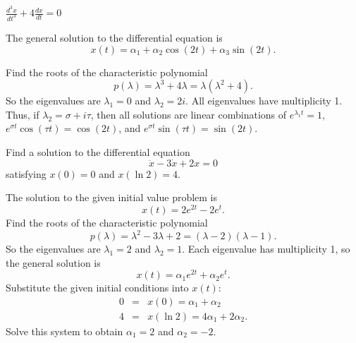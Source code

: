 \documentclass{ximera}
\begin{document}
\begin{exercise} \label{c12.2.5}
$\frac{d^3x}{dt^3}+4\frac{dx}{dt} = 0$

\begin{solution}
\ans The general solution to the differential equation is
\[
x(t) = \alpha_1 + \alpha_2\cos(2t) + \alpha_3\sin(2t).
\]

\soln Find the roots of the characteristic polynomial
\[
p(\lambda) = \lambda^3 + 4\lambda = \lambda(\lambda^2 + 4).
\]
So the eigenvalues are $\lambda_1 = 0$ and $\lambda_2 = 2i$.  All
eigenvalues have multiplicity 1.  Thus, if $\lambda_2 = \sigma + i\tau$, then
all solutions are linear combinations of $e^{\lambda_1 t} = 1$,
$e^{\sigma t}\cos(\tau t) = \cos(2t)$, and $e^{\sigma t}\sin(\tau t)
= \sin(2t)$.

\end{solution}
\end{exercise}

\begin{exercise} \label{c12.2.a6}
Find a solution to the differential equation 
\[
\ddot{x} -3\dot{x} + 2x = 0
\]
satisfying $x(0)=0$ and $x(\ln 2) = 4$.

\begin{solution}
\ans The solution to the given initial value problem is
\[
x(t) = 2e^{2t} - 2e^t.
\]
\soln Find the roots of the characteristic polynomial
\[
p(\lambda) = \lambda^2 - 3\lambda + 2 = (\lambda - 2)(\lambda - 1).
\]
So the eigenvalues are $\lambda_1 = 2$ and $\lambda_2 = 1$.  Each eigenvalue
has multiplicity 1, so the general solution is
\[
x(t) = \alpha_1e^{2t} + \alpha_2e^t.
\]
Substitute the given initial conditions into $x(t)$:
\[
\begin{array}{rcl}
0 & = & x(0) = \alpha_1 + \alpha_2 \\
4 & = & x(\ln 2) = 4\alpha_1 + 2\alpha_2.
\end{array}
\]
Solve this system to obtain $\alpha_1 = 2$ and $\alpha_2 = -2$.

\end{solution}
\end{exercise}




\CEXER
\end{document}
